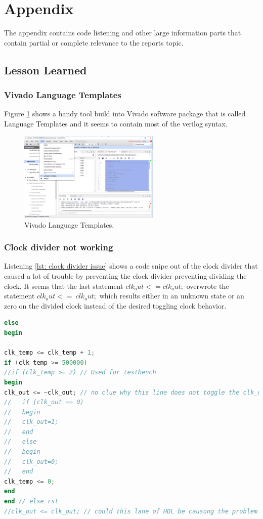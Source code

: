 \section{Appendix} \label{sec: Appendix}
The appendix contains code listening and other large information parts that contain partial or complete relevance to the reports topic. 

\subsection{Lesson Learned} \label{subsec: Lesson Learned}
\subsubsection{Vivado Language Templates} \label{subsubsec: Vivado Language Templates}
Figure \ref{fig: Vivado_LanguageTemplates} shows a handy tool build into Vivado software package that is called Language Templates and it seems to contain most of the verilog syntax.
\begin{figure}[htbp]
	\centering
	\includegraphics[width=0.6\textwidth]{01_images/Vivado_LanguageTemplates.png}
	\caption{Vivado Language Templates.}
	\label{fig: Vivado_LanguageTemplates}
\end{figure}
\subsubsection{Clock divider not working} \label{subsubsec: Clock divider not working}
Listening \ref{lst: clock divider issue} shows a code snipe out of the clock divider that caused a lot of trouble by preventing the clock divider preventing dividing the clock. It seems that the last statement $clk_out <= clk_out;$ overwrote the statement 
$clk_out <= ~clk_out;$ which results either in an unknown state or an zero on the divided clock instead of the desired toggling clock behavior. 
\begin{lstlisting}[language=verilog,caption={Clock divider issue.},label=lst: clock divider issue]
else
begin

clk_temp <= clk_temp + 1;
if (clk_temp >= 500000) 
//if (clk_temp >= 2) // Used for testbench
begin
clk_out <= ~clk_out; // no clue why this line does not toggle the clk_out
//   if (clk_out == 0) 
//   begin
//   clk_out=1;
//   end 
//   else
//   begin
//   clk_out=0;
//   end
clk_temp <= 0;
end
end // else rst
//clk_out <= clk_out; // could this lane of HDL be causong the problem of the not working clk divider? Yes, it is!!!

\end{lstlisting}
